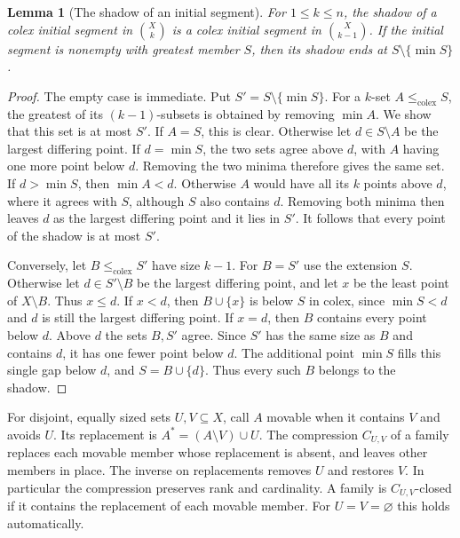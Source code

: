 \documentclass[11pt,oneside,openany]{book}
\theoremstyle{plain}
\newtheorem{lemma}[theorem]{Lemma}
\theoremstyle{definition}
\theoremstyle{remark}
\begin{document}
\begin{lemma}[The shadow of an initial segment]\label{p205:colex-shadow}
For \(1\le k\le n\), the shadow of a colex initial segment in
\(\binom Xk\) is a colex initial segment in \(\binom X{k-1}\).
If the initial segment is nonempty with greatest member \(S\),
then its shadow ends at \(S\setminus\{\min S\}\).
\end{lemma}
\begin{proof}
The empty case is immediate. Put \(S'=S\setminus\{\min S\}\).
For a \(k\)-set \(A\le_{\mathrm{colex}} S\), the greatest of its
\((k-1)\)-subsets is obtained by removing \(\min A\). We show that
this set is at most \(S'\). If \(A=S\), this is clear. Otherwise
let \(d\in S\setminus A\) be the largest differing point.
If \(d=\min S\), the two sets agree above \(d\), with \(A\) having
one more point below \(d\). Removing the two minima therefore
gives the same set. If \(d>\min S\), then \(\min A<d\). Otherwise
\(A\) would have all its \(k\) points above \(d\), where it agrees
with \(S\), although \(S\) also contains \(d\). Removing both minima
then leaves \(d\) as the largest differing point and it lies in \(S'\).
It follows that every point of the shadow is at most \(S'\).

Conversely, let \(B\le_{\mathrm{colex}}S'\) have size \(k-1\).
For \(B=S'\) use the extension \(S\). Otherwise let \(d\in S'\setminus B\)
be the largest differing point, and let \(x\) be the least point of
\(X\setminus B\). Thus \(x\le d\). If \(x<d\), then \(B\cup\{x\}\)
is below \(S\) in colex, since \(\min S<d\) and \(d\) is still the
largest differing point. If \(x=d\), then \(B\) contains every point
below \(d\). Above \(d\) the sets \(B,S'\) agree. Since \(S'\) has
the same size as \(B\) and contains \(d\), it has one fewer point
below \(d\). The additional point \(\min S\) fills this single
gap below \(d\), and \(S=B\cup\{d\}\). Thus every such \(B\)
belongs to the shadow.
\end{proof}

For disjoint, equally sized sets \(U,V\subseteq X\), call \(A\)
movable when it contains \(V\) and avoids \(U\). Its replacement
is \(A^*=(A\setminus V)\cup U\). The compression \(C_{U,V}\)
of a family replaces each movable member whose replacement
is absent, and leaves other members in place. The inverse on
replacements removes \(U\) and restores \(V\). In particular the
compression preserves rank and cardinality. A family is
\(C_{U,V}\)-closed if it contains the replacement of each
movable member. For \(U=V=\varnothing\) this holds automatically.
\end{document}
